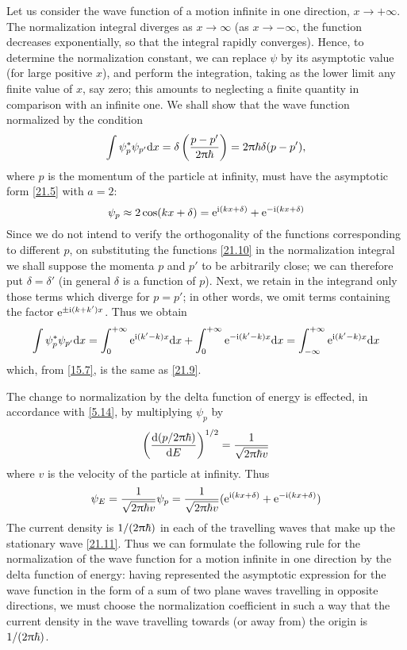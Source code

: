 Let us consider the wave function of a motion infinite in one direction, $ x \to+\infty$. The normalization integral diverges as $ x \to\infty $ (as $ x \to-\infty $, the function decreases exponentially, so that the integral rapidly converges). Hence, to determine the normalization constant, we can replace $\psi$ by its asymptotic value (for large positive $ x $), and perform the integration, taking as the lower limit any finite value of $ x $, say zero; this amounts to neglecting a finite quantity in comparison with an infinite one. We shall show that the wave function normalized by the condition
\begin{equation}\label{21.9}
\int\psi_p^*\psi_{p'}\mathrm{d} x=\delta\left(\frac{p-p'}{2\uppi\hbar}\right)=2\uppi\hbar\delta(p-p'), 
\end{equation}
where $ p $ is the momentum of the particle at infinity, must have the asymptotic form \eqref{21.5} with $ a = 2 $:
\begin{equation}\label{21.10}
\psi_p\approx2\cos(kx+\delta)=\mathrm{e}^{\mathrm{i} (kx+\delta)}+\mathrm{e}^{-\mathrm{i}(kx+\delta)}
\end{equation}
Since we do not intend to verify the orthogonality of the functions corresponding to different $ p $, on substituting the functions \eqref{21.10} in the normalization integral we shall suppose the momenta $ p $ and $ p' $ to be arbitrarily close; we can therefore put $ \delta=\delta' $ (in general $\delta$ is a function of $ p $). Next, we retain in the integrand only those terms which diverge for $ p = p' $; in other words, we omit terms containing the factor $ \mathrm{e}^{\pm\mathrm{i} (k+k')x} $. Thus we obtain
\[ \int\psi_p^*\psi_{p'}\mathrm{d} x=\int_{0}^{+\infty}\mathrm{e}^{\mathrm{i}(k'-k)x}\mathrm{d} x+\int_{0}^{+\infty}\mathrm{e}^{-\mathrm{i}(k'-k)x}\mathrm{d} x=\int_{-\infty}^{+\infty}\mathrm{e}^{\mathrm{i}(k'-k)x}\mathrm{d} x \]
which, from \eqref{15.7}, is the same as \eqref{21.9}.

The change to normalization by the delta function of energy is effected, in accordance with \eqref{5.14}, by multiplying $\psi_p$ by
\[ \left(\frac{\mathrm{d}(p/2\uppi\hbar)}{\mathrm{d} E}\right)^{1/2}=\frac{1}{\sqrt{2\uppi\hbar v}} \]
where $ v $ is the velocity of the particle at infinity. Thus
\begin{equation}\label{21.11}
\psi_E=\frac{1}{\sqrt{2\uppi\hbar v}}\psi_p=\frac{1}{\sqrt{2\uppi\hbar v}}(\mathrm{e}^{\mathrm{i}(kx+\delta)}+\mathrm{e}^{-\mathrm{i}(kx+\delta)})
\end{equation}
The current density is $ 1/(2\uppi\hbar) $ in each of the travelling waves that make up the stationary wave \eqref{21.11}. Thus we can formulate the following rule for the normalization of the wave function for a motion infinite in one direction by the delta function of energy: having represented the asymptotic expression for the wave function in the form of a sum of two plane waves travelling in opposite directions, we must choose the normalization coefficient in such a way that the current density in the wave travelling towards (or away from) the origin is $ 1/(2\uppi\hbar) $.

